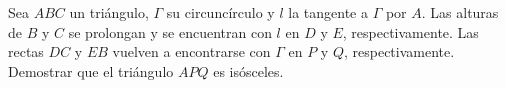 Sea $ABC$ un triángulo, $\Gamma$ su circuncírculo y $l$ la tangente a $\Gamma$ por $A$. Las alturas de $B$ y $C$ se prolongan y se encuentran con $l$ en $D$ y $E$, respectivamente. Las rectas $DC$ y $EB$ vuelven a encontrarse con $\Gamma$ en $P$ y $Q$, respectivamente. Demostrar que el triángulo $APQ$ es isósceles.
